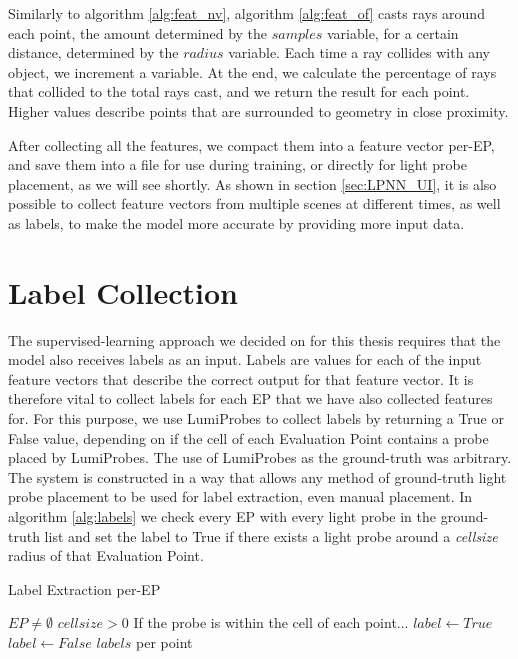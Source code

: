 Similarly to algorithm \ref{alg:feat_nv}, algorithm \ref{alg:feat_of} casts rays around each point, the amount determined by the $samples$ variable, for a certain distance, determined by the $radius$ variable. Each time a ray collides with any object, we increment a variable. At the end, we calculate the percentage of rays that collided to the total rays cast, and we return the result for each point. Higher values describe points that are surrounded to geometry in close proximity.

After collecting all the features, we compact them into a feature vector per-EP, and save them into a file for use during training, or directly for light probe placement, as we will see shortly. As shown in section \ref{sec:LPNN_UI}, it is also possible to collect feature vectors from multiple scenes at different times, as well as labels, to make the model more accurate by providing more input data. 

\section{Label Collection}
\label{sec:label_coll}

The supervised-learning approach we decided on for this thesis requires that the model also receives labels as an input. Labels are values for each of the input feature vectors that describe the correct output for that feature vector. It is therefore vital to collect labels for each EP that we have also collected features for. For this purpose, we use LumiProbes \parencite{Vardis2021} to collect labels by returning a True or False value, depending on if the cell of each Evaluation Point contains a probe placed by LumiProbes. The use of LumiProbes as the ground-truth was arbitrary. The system is constructed in a way that allows any method of ground-truth light probe placement to be used for label extraction, even manual placement. In algorithm \ref{alg:labels} we check every EP with every light probe in the ground-truth list and set the label to True if there exists a light probe around a \textit{cellsize} radius of that Evaluation Point.

\begin{algorithm}
	\caption{Label Extraction per-EP}
	\label{alg:labels}
	\begin{algorithmic}[1]
		\Require $EP \neq \emptyset$
		\Require $cellsize > 0$
				\Comment If the probe is within the cell of each point...
					\State $label \gets True$
				\Else
					\State $label \gets False$
				\EndIf
			\EndFor
		\EndFor
		\State \Return $labels$ per point
	\end{algorithmic}
\end{algorithm}

